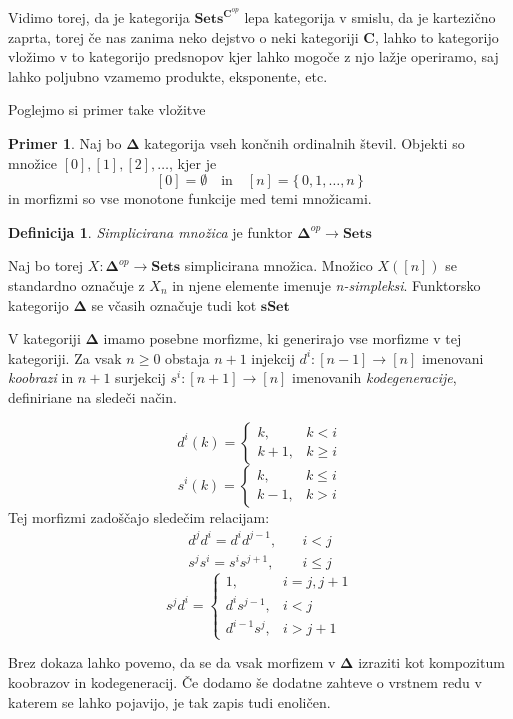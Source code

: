 \documentclass[12pt,a4paper]{book}
\theoremstyle{definition}
\newtheorem{definicija}{Definicija}[chapter]
\theoremstyle{plain}
\theoremstyle{definition}
\newtheorem{primer}{Primer}[section]
\theoremstyle{remark}
\newcommand{\cat}[1]{\textbf{#1}}
\renewcommand{\set}[1]{\{\,#1\,\}}
\newcommand{\predsnop}[1]{\cat{Sets}^{\cat{#1}^{op}}}
\begin{document}
Vidimo torej, da je kategorija $\predsnop{C}$ lepa kategorija v smislu, da je kartezično zaprta, torej če nas zanima neko dejstvo o neki kategoriji $\cat{C}$, lahko to kategorijo vložimo v to kategorijo predsnopov kjer lahko mogoče z njo lažje operiramo, saj lahko poljubno vzamemo produkte, eksponente, etc.


Poglejmo si primer take vložitve

\begin{primer}
Naj bo $\mathbf{\Delta}$ kategorija vseh končnih ordinalnih števil. Objekti so množice $[0],[1],[2],\ldots$, kjer je 
$$[0] = \emptyset \quad \text{in} \quad [n] = \set{0,1,\ldots,n}$$
in morfizmi so vse monotone funkcije med temi množicami.

\begin{definicija}
\emph{Simplicirana množica} je funktor $\mathbf{\Delta}^{op} \to \cat{Sets}$
\end{definicija}
Naj bo torej $X : \mathbf{\Delta}^{op} \to \cat{Sets}$ simplicirana množica. Množico $X([n])$ se standardno označuje z $X_n$ in njene elemente imenuje \emph{n-simpleksi}. Funktorsko kategorijo $\mathbf{\Delta}$ se včasih označuje tudi kot $\cat{sSet}$

V kategoriji $\mathbf{\Delta}$ imamo posebne morfizme, ki generirajo vse morfizme v tej kategoriji. Za vsak $n \geq 0$ obstaja $n+1$ injekcij $d^i : [n-1] \to [n]$ imenovani \emph{koobrazi} in $n+1$ surjekcij $s^i : [n+1] \to [n]$ imenovanih \emph{kodegeneracije}, definiriane na sledeči način.

$$d^i(k) = \begin{cases}
k, & k < i \\
k+1, & k \geq i 
\end{cases} $$
$$s^i(k) = \begin{cases}
k, & k \leq i \\
k-1, & k > i
\end{cases} $$
Tej morfizmi zadoščajo sledečim relacijam:
\begin{align*}
d^j d^i = d^i d^{j-1}, & \quad i < j \\
s^j s^i = s^i s^{j+1}, & \quad i \leq j 
\end{align*}
$$ s^j d^i = \begin{cases}
1, & i = j, j+1 \\
d^i s^{j-1}, & i < j \\
d^{i-1} s^j, & i > j+1
\end{cases} $$

Brez dokaza lahko povemo, da se da vsak morfizem v $\mathbf{\Delta}$ izraziti kot kompozitum koobrazov in kodegeneracij. Če dodamo še dodatne zahteve o vrstnem redu v katerem se lahko pojavijo, je tak zapis tudi enoličen.



\end{primer}
\end{document}
